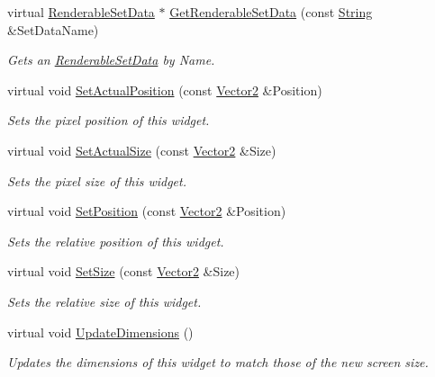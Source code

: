 \begin{DoxyCompactItemize}
virtual \hyperlink{structMezzanine_1_1UI_1_1RenderableSetData}{RenderableSetData} $\ast$ \hyperlink{classMezzanine_1_1UI_1_1TabSet_ab70db8423339f4ad5c11070201e42cc2}{GetRenderableSetData} (const \hyperlink{namespaceMezzanine_acf9fcc130e6ebf08e3d8491aebcf1c86}{String} \&SetDataName)
\begin{DoxyCompactList}\small\item\em Gets an \hyperlink{structMezzanine_1_1UI_1_1RenderableSetData}{RenderableSetData} by Name. \item\end{DoxyCompactList}\item 
virtual void \hyperlink{classMezzanine_1_1UI_1_1TabSet_ac4cb545982397148d0df237eee062cb3}{SetActualPosition} (const \hyperlink{classMezzanine_1_1Vector2}{Vector2} \&Position)
\begin{DoxyCompactList}\small\item\em Sets the pixel position of this widget. \item\end{DoxyCompactList}\item 
virtual void \hyperlink{classMezzanine_1_1UI_1_1TabSet_a1093eb0ab0b862665cfb567bb5d73341}{SetActualSize} (const \hyperlink{classMezzanine_1_1Vector2}{Vector2} \&Size)
\begin{DoxyCompactList}\small\item\em Sets the pixel size of this widget. \item\end{DoxyCompactList}\item 
virtual void \hyperlink{classMezzanine_1_1UI_1_1TabSet_a7474438cae418c74f192dc48ad5a4170}{SetPosition} (const \hyperlink{classMezzanine_1_1Vector2}{Vector2} \&Position)
\begin{DoxyCompactList}\small\item\em Sets the relative position of this widget. \item\end{DoxyCompactList}\item 
virtual void \hyperlink{classMezzanine_1_1UI_1_1TabSet_ac125a2abc7b12d3c81969bdd407be883}{SetSize} (const \hyperlink{classMezzanine_1_1Vector2}{Vector2} \&Size)
\begin{DoxyCompactList}\small\item\em Sets the relative size of this widget. \item\end{DoxyCompactList}\item 
virtual void \hyperlink{classMezzanine_1_1UI_1_1TabSet_a191f67ec19fc80f63eb842305f8cfb05}{UpdateDimensions} ()
\begin{DoxyCompactList}\small\item\em Updates the dimensions of this widget to match those of the new screen size. \item\end{DoxyCompactList}\end{DoxyCompactItemize}
